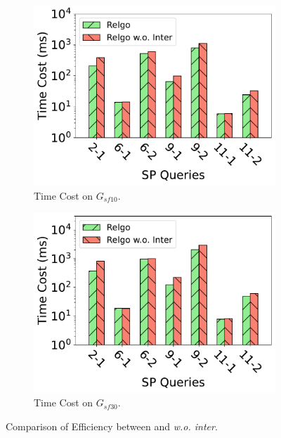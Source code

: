 
\begin{figure}[ht]
    \centering
    \begin{subfigure}[b]{.45\linewidth}
        \centering
        \includegraphics[width=\linewidth]{./figures/exp/filter_sf10.pdf}
        \caption{Time Cost on $G_{sf10}$.}
        \label{fig:exp-filter-sf10}
    \end{subfigure}
    \begin{subfigure}[b]{0.45\linewidth}
        \centering
        \includegraphics[width=\linewidth]{./figures/exp/filter_sf30.pdf}
        \caption{Time Cost on $G_{sf30}$.}
        \label{fig:exp-filter-sf30}
    \end{subfigure}
    \caption{Comparison of Efficiency between \name and \textit{\name w.o. inter}.}
    \label{fig:exp-filter}
\end{figure}

